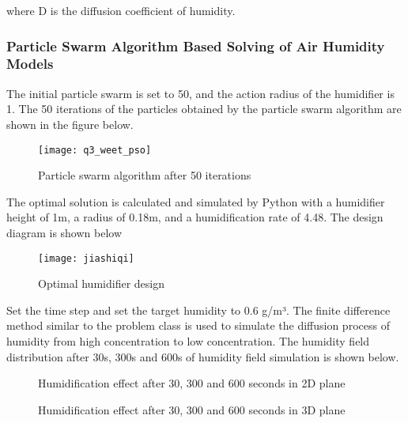 \documentclass{apmcmthesis}
\begin{document}
where D is the diffusion coefficient of humidity.

\subsubsection{Particle Swarm Algorithm Based Solving of Air Humidity Models}
The initial particle swarm is set to 50, and the action radius of the humidifier is 1. The 50 iterations of the particles obtained by the particle swarm algorithm are shown in the figure below.

\begin{figure}[H]
	\centering
	\texttt{[image: q3\_weet\_pso]}%
	\caption{Particle swarm algorithm after 50 iterations} %
\end{figure}



The optimal solution is calculated and simulated by Python with a humidifier height of 1m, a radius of 0.18m, and a humidification rate of 4.48. The design diagram is shown below
\begin{figure}[H]
	\centering
	\texttt{[image: jiashiqi]}%
	\caption{Optimal humidifier design} %
\end{figure}



Set the time step and set the target humidity to 0.6 g/m³. The finite difference method similar to the problem class is used to simulate the diffusion process of humidity from high concentration to low concentration. The humidity field distribution after 30s, 300s and 600s of humidity field simulation is shown below.
\begin{figure}[H]
	\centering    
	\caption{Humidification effect after 30, 300 and 600 seconds in 2D plane}		%
\end{figure}
\begin{figure}[H]
	\centering    
	\caption{Humidification effect after 30, 300 and 600 seconds in 3D plane}		%
\end{figure}
\end{document}
